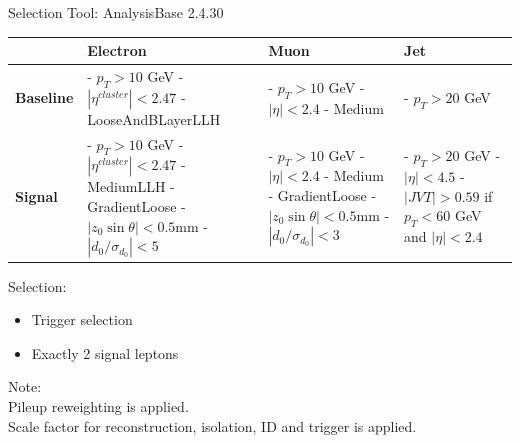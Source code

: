 \documentclass[mathserif,serif]{beamer}
\begin{document}
\begin{frame}{Selection}
\small
Tool: AnalysisBase 2.4.30 \\

\centering
\begin{table}
\small
\begin{tabularx}{\textwidth}{p{1.5cm} | p{3cm} | p{3cm} | p{3cm}}
& \textbf{Electron} & \textbf{Muon} & \textbf{Jet}\\
\hline
\textbf{Baseline}
& - $p_T>10$ GeV \newline - $|\eta^{cluster}| < 2.47$ \newline - LooseAndBLayerLLH
& - $p_T>10$ GeV \newline - $|\eta| < 2.4$ \newline - Medium
& - $p_T>20$ GeV \\
\hline
\textbf{Signal}
& - $p_T > 10$ GeV \newline - $|\eta^{cluster}| < 2.47$ \newline - MediumLLH \newline - GradientLoose \newline - $|z_0 \sin \theta| < 0.5$mm \newline - $|d_0/\sigma_{d_0}| < 5$
& - $p_T > 10$ GeV \newline - $|\eta| < 2.4$ \newline - Medium \newline - GradientLoose \newline - $|z_0 \sin \theta| < 0.5$mm \newline - $|d_0/\sigma_{d_0}| < 3$
& - $p_T > 20$ GeV \newline - $|\eta|<4.5$ \newline \newline - $|JVT| > 0.59$ \newline if $p_T < 60$ GeV \newline and $|\eta| < 2.4$
\end{tabularx}
\end{table}

\raggedright
Selection:
\begin{itemize}
\item Trigger selection
\item Exactly 2 signal leptons
\end{itemize}

\tiny
Note: \\
Pileup reweighting is applied. \\
Scale factor for reconstruction, isolation, ID and trigger is applied.
\end{frame}
\end{document}
